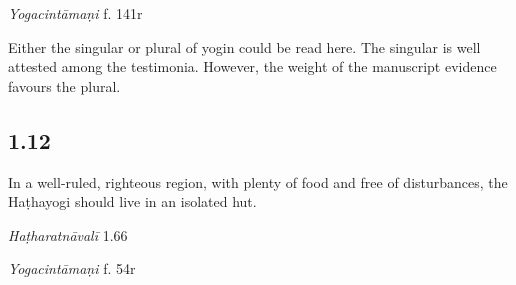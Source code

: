 \begin{ekdosis}
\begin{testimonia}[hp01_011]
\emph{Yogacintāmaṇi} f. 141r %

\begin{versinnote}
\end{versinnote}

\end{testimonia}

\begin{philcomm}[hp01_011]        
Either the singular or plural of yogin could be read here. The singular is well attested among the testimonia. However, the weight of the manuscript evidence favours the plural.  
\end{philcomm}

\subsection*{1.12}
\begin{translation}[hp01_012]
In a well-ruled, righteous region, with plenty of food and free of disturbances, the Haṭhayogi should live in an isolated hut.
\end{translation}

\begin{sources}[hp01_012]
\end{sources}

\begin{testimonia}[hp01_012]
\emph{Haṭharatnāvalī} 1.66

\begin{versinnote}
\end{versinnote}

\emph{Yogacintāmaṇi} f. 54r

\begin{versinnote}
\end{versinnote}


\end{testimonia}
\end{ekdosis}
